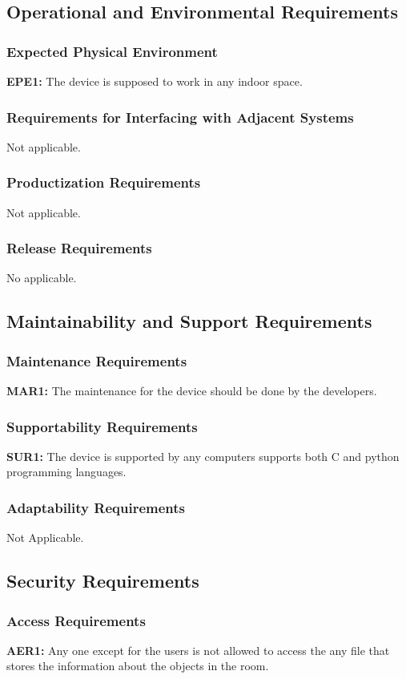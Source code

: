 \documentclass[12pt]{article}
\begin{document}
\subsection{Operational and Environmental Requirements}
\subsubsection{Expected Physical Environment}
\textbf{EPE1:} The device is supposed to work in any indoor space.
\subsubsection{Requirements for Interfacing with Adjacent Systems}
Not applicable.
\subsubsection{Productization Requirements}
Not applicable.
\subsubsection{Release Requirements}
No applicable.
\subsection{Maintainability and Support Requirements}
\subsubsection{Maintenance Requirements}
\textbf{MAR1:} The maintenance for the device should be done by the developers.
\subsubsection{Supportability Requirements}
\textbf{SUR1:} The device is supported by any computers supports both C and python programming languages.
\subsubsection{Adaptability Requirements}
Not Applicable.
\subsection{Security Requirements}
\subsubsection{Access Requirements}
\textbf{AER1:} Any one except for the users is not allowed to access the any file that stores the information about the objects in the room.
\end{document}
